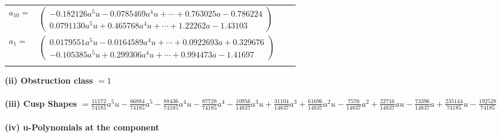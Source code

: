 \documentclass[1p]{elsarticle_modified}
\theoremstyle{definition}
\begin{document}
\begin{tabular}{m{7pt} m{180pt} m{7pt} m{180pt} }
\flushright $a_{10}=$&$\begin{pmatrix}-0.182126 a^{5} u-0.0785469 a^{4} u+\cdots+0.763025 a-0.786224\\0.0791130 a^{5} u+0.465768 a^{4} u+\cdots+1.22262 a-1.43103\end{pmatrix}$ \\
\flushright $a_{1}=$&$\begin{pmatrix}0.0179551 a^{5} u-0.0164589 a^{4} u+\cdots+0.0922693 a+0.329676\\-0.105385 a^{5} u+0.299306 a^{4} u+\cdots+0.994473 a-1.41697\end{pmatrix}$\\&\end{tabular}
\flushleft \textbf{(ii) Obstruction class $= 1$}\\~\\
\flushleft \textbf{(iii) Cusp Shapes $= \frac{11172}{74185} a^5 u-\frac{66884}{74185} a^5-\frac{88436}{74185} a^4 u-\frac{87728}{74185} a^4-\frac{10956}{14837} a^3 u+\frac{31104}{14837} a^3+\frac{61696}{14837} a^2 u-\frac{7576}{14837} a^2+\frac{22716}{14837} a u-\frac{73396}{14837} a+\frac{235144}{74185} u-\frac{192528}{74185}$}\\~\\
\newpage\renewcommand{\arraystretch}{1}
\flushleft \textbf{(iv) u-Polynomials at the component}\newline \\
\end{document}
